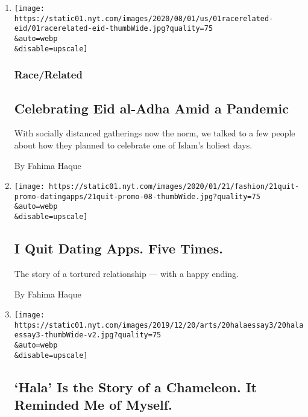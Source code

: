 \begin{enumerate}
\def\labelenumi{\arabic{enumi}.}
\item
  \href{/2020/08/01/us/eid-al-adha-coronavirus.html}{}

  \texttt{[image: https://static01.nyt.com/images/2020/08/01/us/01racerelated-eid/01racerelated-eid-thumbWide.jpg?quality=75\\\&auto=webp\\\&disable=upscale]}

  \hypertarget{racerelated}{%
  \subsubsection{Race/Related}\label{racerelated}}

  \hypertarget{celebrating-eid-al-adha-amid-a-pandemic}{%
  \subsection{Celebrating Eid al-Adha Amid a
  Pandemic}\label{celebrating-eid-al-adha-amid-a-pandemic}}

  With socially distanced gatherings now the norm, we talked to a few
  people about how they planned to celebrate one of Islam's holiest
  days.

  By Fahima Haque
\item
  \href{/2020/01/20/style/quit-dating-apps.html}{}

  \texttt{[image: https://static01.nyt.com/images/2020/01/21/fashion/21quit-promo-datingapps/21quit-promo-08-thumbWide.jpg?quality=75\\\&auto=webp\\\&disable=upscale]}

  \hypertarget{i-quit-dating-apps-five-times}{%
  \subsection{I Quit Dating Apps. Five
  Times.}\label{i-quit-dating-apps-five-times}}

  The story of a tortured relationship --- with a happy ending.

  By Fahima Haque
\item
  \href{/2019/12/19/arts/hala-pakistani-american-community.html}{}

  \texttt{[image: https://static01.nyt.com/images/2019/12/20/arts/20halaessay3/20halaessay3-thumbWide-v2.jpg?quality=75\\\&auto=webp\\\&disable=upscale]}

  \hypertarget{hala-is-the-story-of-a-chameleon-it-reminded-me-of-myself}{%
  \subsection{`Hala' Is the Story of a Chameleon. It Reminded Me of
  Myself.}\label{hala-is-the-story-of-a-chameleon-it-reminded-me-of-myself}}


\end{enumerate}

